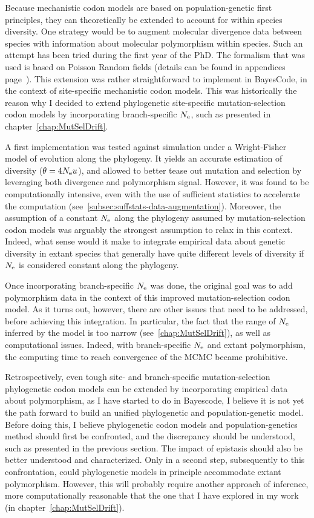 Because mechanistic \gls{codon} models are based on population-genetic first principles, they can theoretically be extended to account for within species diversity.
One strategy would be to augment molecular divergence data between species with information about molecular polymorphism within species.
Such an attempt has been tried during the first year of the PhD.
The formalism that was used is based on Poisson Random fields (details can be found in appendices page~\pageref{sec-appendix:PRF}).
This extension was rather straightforward to implement in BayesCode, in the context of site-specific mechanistic codon models.
This was historically the reason why I decided to extend phylogenetic site-specific mutation-selection codon models by incorporating branch-specific $N_{\textrm{e}}$, such as presented in chapter~\ref{chap:MutSelDrift}.

A first implementation was tested against simulation under a Wright-Fisher model of evolution along the phylogeny.
It yields an accurate estimation of diversity ($\theta = 4 N_{\textrm{e}} u$), and allowed to better tease out mutation and selection by leveraging both divergence and polymorphism signal.
However, it was found to be computationally intensive, even with the use of sufficient statistics to accelerate the computation (see~\ref{subsec:suffstats-data-augmentation}).
Moreover, the assumption of a constant $N_{\textrm{e}}$ along the phylogeny assumed by mutation-selection codon models was arguably the strongest assumption to relax in this context.
Indeed, what sense would it make to integrate empirical data about genetic diversity in extant species that generally have quite different levels of diversity if $N_{\textrm{e}}$ is considered constant along the phylogeny.

Once incorporating branch-specific $N_{\textrm{e}}$ was done, the original goal was to add polymorphism data in the context of this improved mutation-selection codon model.
As it turns out, however, there are other issues that need to be addressed, before achieving this integration.
In particular, the fact that the range of $N_{\textrm{e}}$ inferred by the model is too narrow (see~\ref{chap:MutSelDrift}), as well as computational issues.
Indeed, with branch-specific $N_{\textrm{e}}$ and extant polymorphism, the computing time to reach convergence of the MCMC became prohibitive.

Retrospectively, even tough site- and branch-specific mutation-selection phylogenetic \gls{codon} models can be extended by incorporating empirical data about polymorphism, as I have started to do in Bayescode, I believe it is not yet the path forward to build an unified phylogenetic and population-genetic model.
Before doing this, I believe phylogenetic codon models and population-genetics method should first be confronted, and the discrepancy should be understood, such as presented in the previous section.
The impact of epistasis should also be better understood and characterized.
Only in a second step, subsequently to this confrontation, could phylogenetic models in principle accommodate extant polymorphism.
However, this will probably require another approach of inference, more computationally reasonable that the one that I have explored in my work (in chapter~\ref{chap:MutSelDrift}).


